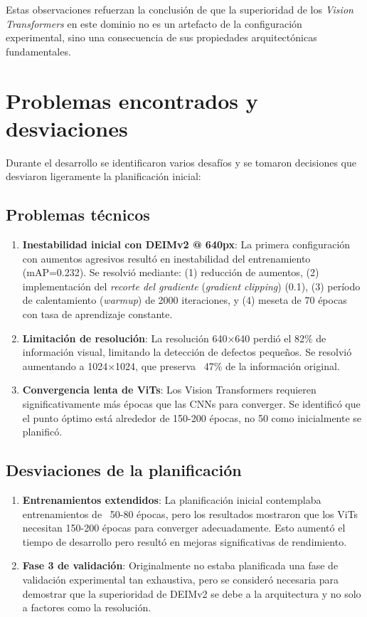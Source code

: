Estas observaciones refuerzan la conclusión de que la superioridad de los \textit{Vision Transformers} en este dominio no es un artefacto de la configuración experimental, sino una consecuencia de sus propiedades arquitectónicas fundamentales.


\section{Problemas encontrados y desviaciones}
\label{sec:problemas}

Durante el desarrollo se identificaron varios desafíos y se tomaron decisiones que desviaron ligeramente la planificación inicial:

\subsection{Problemas técnicos}

\begin{enumerate}
    \item \textbf{Inestabilidad inicial con DEIMv2 @ 640px}: La primera configuración con aumentos agresivos resultó en inestabilidad del entrenamiento (mAP=0.232). Se resolvió mediante: (1) reducción de aumentos, (2) implementación del \textit{recorte del gradiente} (\textit{gradient clipping}) (0.1), (3) período de calentamiento (\textit{warmup}) de 2000 iteraciones, y (4) meseta de 70 épocas con tasa de aprendizaje constante.
    
    \item \textbf{Limitación de resolución}: La resolución 640×640 perdió el 82\% de información visual, limitando la detección de defectos pequeños. Se resolvió aumentando a 1024×1024, que preserva ~47\% de la información original.
    
    \item \textbf{Convergencia lenta de ViTs}: Los Vision Transformers requieren significativamente más épocas que las CNNs para converger. Se identificó que el punto óptimo está alrededor de 150-200 épocas, no 50 como inicialmente se planificó.
\end{enumerate}

\subsection{Desviaciones de la planificación}

\begin{enumerate}
    \item \textbf{Entrenamientos extendidos}: La planificación inicial contemplaba entrenamientos de ~50-80 épocas, pero los resultados mostraron que los ViTs necesitan 150-200 épocas para converger adecuadamente. Esto aumentó el tiempo de desarrollo pero resultó en mejoras significativas de rendimiento.
    
    \item \textbf{Fase 3 de validación}: Originalmente no estaba planificada una fase de validación experimental tan exhaustiva, pero se consideró necesaria para demostrar que la superioridad de DEIMv2 se debe a la arquitectura y no solo a factores como la resolución.
\end{enumerate}

